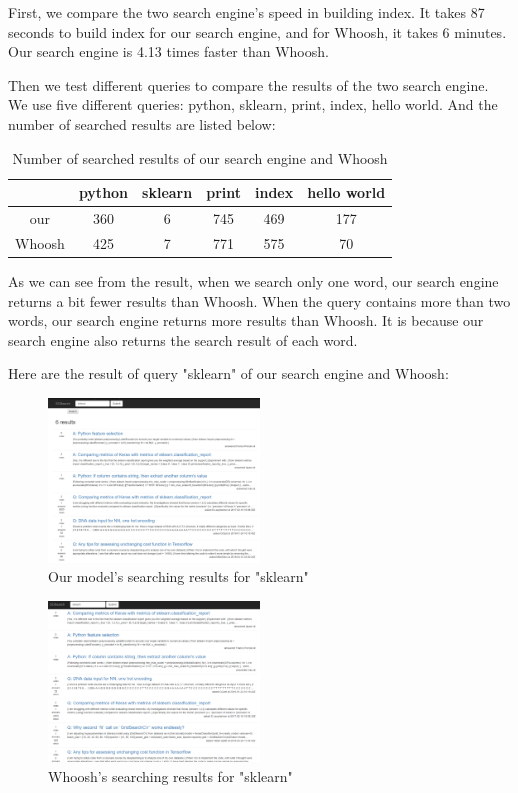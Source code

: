 \documentclass[10pt,journal,compsoc]{IEEEtran}
\begin{document}
First, we compare the two search engine's speed in building index. It takes 87 seconds to build index for our search engine, and for Whoosh, it takes 6 minutes. Our search engine is 4.13 times faster than Whoosh.

Then we test different queries to compare the results of the two search engine. We use five different queries: python, sklearn, print, index, hello world. And the number of searched results are listed below:

\begin{table}[H]
\centering
\caption{Number of searched results of our search engine and Whoosh}
\begin{tabular}{cccccc}
\toprule
      & python & sklearn & print & index & hello world \\
\midrule
our  & 360    & 6       & 745   & 469   & 177         \\
Whoosh & 425    & 7       & 771   & 575   & 70       \\  
\bottomrule
\end{tabular}
\end{table}

As we can see from the result, when we search only one word, our search engine returns a bit fewer results than Whoosh. When the query contains more than two words, our search engine returns more results than Whoosh. It is because our search engine also returns the search result of each word.

Here are the result of query "sklearn" of our search engine and Whoosh:\\
\begin{figure}[H]
  \centering
    \includegraphics[width=0.5\textwidth]{images/testsklearn.png}
    \caption{Our model's searching results for "sklearn"}
\end{figure}

\begin{figure}[H]
  \centering
    \includegraphics[width=0.5\textwidth]{images/whooshsklearn.png}
    \caption{Whoosh's searching results for "sklearn"}
\end{figure}
\end{document}

